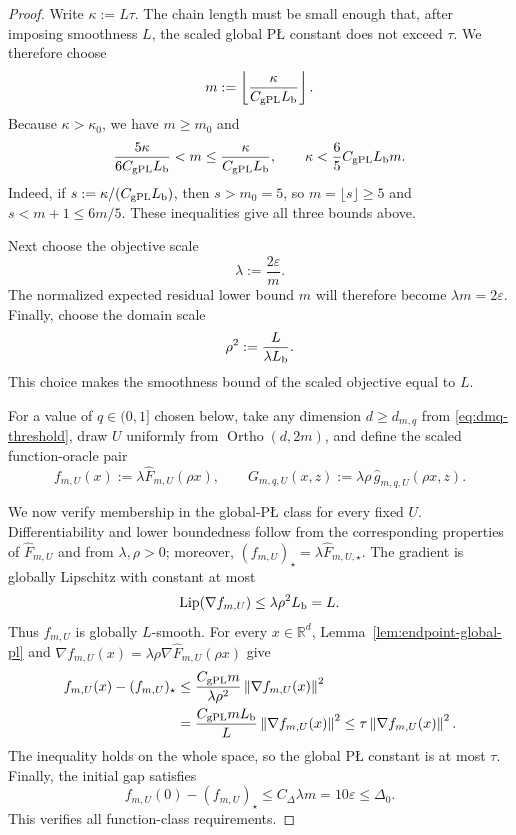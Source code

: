 \documentclass[11pt]{article}
\newcommand{\R}{\mathbb{R}}
\newcommand{\norm}[1]{\left\lVert #1\right\rVert}
\newcommand{\Ortho}{\operatorname{Ortho}}
\begin{document}
\begin{proof}
\begingroup
Write $\kappa:=L\tau$. The chain length must be small enough that, after imposing smoothness $L$, the scaled global
P\L{} constant does not exceed $\tau$. We therefore choose
\begin{equation}
\label{eq:endpoint-scaling-choice}
m:=\left\lfloor\frac{\kappa}{C_{\mathrm{gPL}}L_{\rm b}}\right\rfloor.
\end{equation}
Because $\kappa>\kappa_0$, we have $m\ge m_0$ and
\begin{equation}
\label{eq:endpoint-m-bounds}
\frac{5\kappa}{6C_{\mathrm{gPL}}L_{\rm b}}
<m
\le
\frac{\kappa}{C_{\mathrm{gPL}}L_{\rm b}},
\qquad
\kappa<\frac65C_{\mathrm{gPL}}L_{\rm b}m.
\end{equation}
Indeed, if $s:=\kappa/(C_{\mathrm{gPL}}L_{\rm b})$, then $s>m_0=5$, so $m=\lfloor s\rfloor\ge5$ and
$s<m+1\le6m/5$. These inequalities give all three bounds above.
\endgroup

Next choose the objective scale
\[
\lambda:=\frac{2\varepsilon}{m}.
\]
The normalized expected residual lower bound $m$ will therefore become $\lambda m=2\varepsilon$. Finally, choose the
domain scale
\[
\rho^2:=\frac{L}{\lambda L_{\rm b}}.
\]
This choice makes the smoothness bound of the scaled objective equal to $L$.

For a value of $q\in(0,1]$ chosen below, take any dimension $d\ge d_{m,q}$ from
\eqref{eq:dmq-threshold}, draw $U$ uniformly from $\Ortho(d,2m)$, and define the scaled function-oracle pair
\begin{equation}
\label{eq:endpoint-scaled-pair}
f_{m,U}(x):=\lambda\widehat F_{m,U}(\rho x),
\qquad
G_{m,q,U}(x,z):=\lambda\rho\,\widehat g_{m,q,U}(\rho x,z).
\end{equation}

\begingroup
We now verify membership in the global-P\L{} class for every fixed $U$. Differentiability and lower boundedness
follow from the corresponding properties of $\widehat F_{m,U}$ and from $\lambda,\rho>0$; moreover,
$(f_{m,U})_\star=\lambda\widehat F_{m,U,\star}$. The gradient is globally Lipschitz with constant at most
\[
\mathrm{Lip}(\nabla f_{m,U})
\le
\lambda\rho^2L_{\rm b}=L.
\]
Thus $f_{m,U}$ is globally $L$-smooth. For every $x\in\R^d$, Lemma~\ref{lem:endpoint-global-pl} and
$\nabla f_{m,U}(x)=\lambda\rho\nabla\widehat F_{m,U}(\rho x)$ give
\begin{align*}
f_{m,U}(x)-(f_{m,U})_\star
&\le
\frac{C_{\mathrm{gPL}}m}{\lambda\rho^2}\norm{\nabla f_{m,U}(x)}^2\\
&=
\frac{C_{\mathrm{gPL}}mL_{\rm b}}{L}\norm{\nabla f_{m,U}(x)}^2
\le
\tau\norm{\nabla f_{m,U}(x)}^2.
\end{align*}
The inequality holds on the whole space, so the global P\L{} constant is at most $\tau$. Finally, the initial
gap satisfies
\begin{equation}
\label{eq:endpoint-scaled-initial-gap}
f_{m,U}(0)-(f_{m,U})_\star
\le
C_\Delta\lambda m
=
10\varepsilon
\le
\Delta_0.
\end{equation}
This verifies all function-class requirements.
\endgroup


\end{proof}
\end{document}
